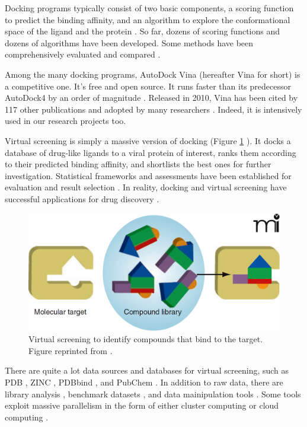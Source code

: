 Docking programs typically consist of two basic components, a scoring function to predict the binding affinity, and an algorithm to explore the conformational space of the ligand and the protein \citep{493}. So far, dozens of scoring functions \citep{579,566,570,775,575,576,578,580,581,774} and dozens of algorithms \citep{595,564,594,602,603,604,605,606,607,781,614,615,617} have been developed. Some methods have been comprehensively evaluated and compared \citep{637,771,556}.

Among the many docking programs, AutoDock Vina \citep{595} (hereafter Vina for short) is a competitive one. It's free and open source. It runs faster than its predecessor AutoDock4 \citep{596} by an order of magnitude \citep{556}. Released in 2010, Vina has been cited by 117 other publications and adopted by many researchers \citep{609}. Indeed, it is intensively used in our research projects too.

Virtual screening is simply a massive version of docking (Figure \ref{fig:VirtualScreening} \citep{470}). It docks a database of drug-like ligands to a viral protein of interest, ranks them according to their predicted binding affinity, and shortlists the best ones for further investigation. Statistical frameworks and assessments have been established for evaluation and result selection \citep{489,491,769,583,582}. In reality, docking and virtual screening have successful applications for drug discovery \citep{495,498,751,503,752,757,506,738,761,763,766,736}.

\begin{figure}
\centering
\includegraphics[width=\textwidth]{Figures/VirtualScreening.png}
\caption{Virtual screening to identify compounds that bind to the target. Figure reprinted from \citep{470}.}
\label{fig:VirtualScreening}
\end{figure}

There are quite a lot data sources and databases for virtual screening, such as PDB \citep{540,539,537,105,538}, ZINC \citep{532}, PDBbind \citep{529,530}, and PubChem \citep{526}. In addition to raw data, there are library analysis \citep{521}, benchmark datasets \citep{534,533,535,536}, and data mainipulation tools \citep{542}. Some tools exploit massive parallelism in the form of either cluster computing or cloud computing \citep{557,773,560,782}.

